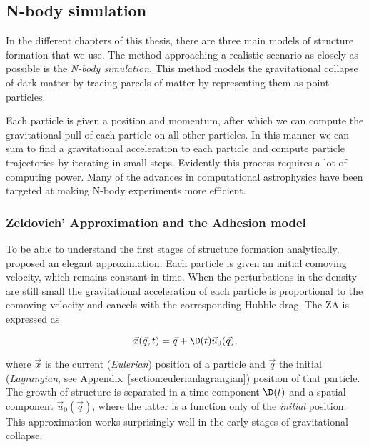 \subsection{N-body simulation}
In the different chapters of this thesis, there are three main models of structure formation that we use. The method approaching a realistic scenario as closely as possible is the \emph{N-body simulation}. This method models the gravitational collapse of dark matter by tracing parcels of matter by representing them as point particles.

Each particle is given a position and momentum, after which we can compute the gravitational pull of each particle on all other particles. In this manner we can sum to find a gravitational acceleration to each particle and compute particle trajectories by iterating in small steps. Evidently this process requires a lot of computing power. Many of the advances in computational astrophysics have been targeted at making N-body experiments more efficient.

\subsubsection{Zeldovich' Approximation and the Adhesion model}
To be able to understand the first stages of structure formation analytically, \citet{Zeldovich1970} proposed an elegant approximation. Each particle is given an initial comoving velocity, which remains constant in time. When the perturbations in the density are still small the gravitational acceleration of each particle is proportional to the comoving velocity and cancels with the corresponding Hubble drag. The \ac{ZA} is expressed as
\begin{shaded*}
\begin{equation}
\vec{x}(\vec{q}, t) = \vec{q} + \D(t) \vec{u}_{0}(\vec{q}),
\label{eq:izeld}
\end{equation}
\end{shaded*}
where $\vec{x}$ is the current (\emph{Eulerian}) position of a particle and $\vec{q}$ the initial (\emph{Lagrangian}, see Appendix~\ref{section:eulerianlagrangian}) position of that particle. The growth of structure is separated in a time component $\D(t)$ and a spatial component $\vec{u}_{0}(\vec{q})$, where the latter is a function only of the \emph{initial} position. This approximation works surprisingly well in the early stages of gravitational collapse.

